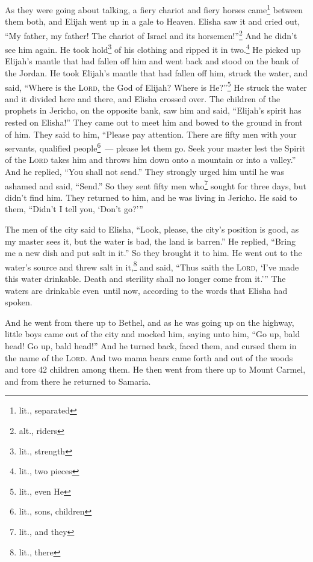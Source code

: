\begin{inparaenum}
     As they were going about talking, a fiery chariot and fiery horses came\footnote{lit., separated} between them both, and Elijah went up in a gale to Heaven.%
     Elisha saw it and cried out, ``My father, my father! The chariot of Israel and its horsemen!''\footnote{alt., riders} And he didn't see him again. He took hold\footnote{lit., strength} of his clothing and ripped it in two.\footnote{lit., two pieces}%
     He picked up Elijah's mantle that had fallen off him and went back and stood on the bank of the Jordan.%
     He took Elijah's mantle that had fallen off him, struck the water, and said, ``Where is the \textsc{Lord}, the God of Elijah? Where is He?''\footnote{lit., even He} He struck the water and it divided here and there, and Elisha crossed over.%
     The children of the prophets in Jericho, on the opposite bank, saw him and said, ``Elijah's spirit has rested on Elisha!'' They came out to meet him and bowed to the ground in front of him.%
     They said to him, ``Please pay attention. There are fifty men with your servants, qualified people\footnote{lit., sons, children}~--- please let them go. Seek your master lest the Spirit of the \textsc{Lord} takes him and throws him down onto a mountain or into a valley.'' And he replied, ``You shall not send.''%
     They strongly urged him until he was ashamed and said, ``Send.'' So they sent fifty men who\footnote{lit., and they} sought for three days, but didn't find him.%
     They returned to him, and he was living in Jericho. He said to them, ``Didn't I tell you, `Don't go?'\thinspace''%
    
     The men of the city said to Elisha, ``Look, please, the city's position is good, as my master sees it, but the water is bad, the land is barren.''%
     He replied, ``Bring me a new dish and put salt in it.'' So they brought it to him.%
     He went out to the water's source and threw salt in it,\footnote{lit., there} and said, ``Thus saith the \textsc{Lord}, `I've made this water drinkable. Death and sterility shall no longer come from it.'\thinspace''%
     The waters are drinkable even\understood\ until now, according to the words that Elisha had spoken.%
    
     And he went from there up to Bethel, and as he was going up on the highway, little boys came out of the city and mocked him, saying unto him, ``Go up, bald head! Go up, bald head!''%
     And he turned back, faced them, and cursed them in the name of the \textsc{Lord}. And two mama bears came forth and out of the woods and tore 42 children among them.%
     He then went from there up to Mount Carmel, and from there he returned to Samaria.%
\end{inparaenum}
